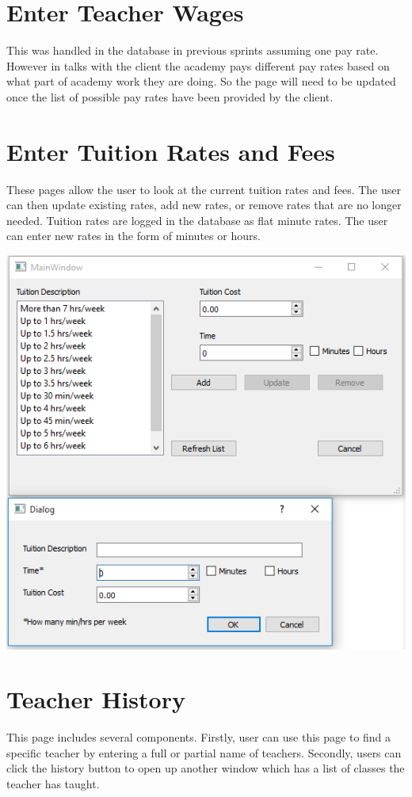 \documentclass[11pt]{book}
\begin{document}
\section{Enter Teacher Wages}
This was handled in the database in previous sprints assuming one pay rate. However in talks with the client the academy pays different pay rates based on what part of academy work they are doing. So the page will need to be updated once the list of possible pay rates have been provided by the client.

\section{Enter Tuition Rates and Fees}
These pages allow the user to look at the current tuition rates and fees. The user can then update existing rates, add new rates, or remove rates that are no longer needed. Tuition rates are logged in the database as flat minute rates. The user can enter new rates in the form of minutes or hours.

\includegraphics[scale=0.5]{tuitionRates.png}

\section{Teacher History}
This page includes several components. Firstly, user can use this page to find a specific teacher by entering a full or partial name of teachers. Secondly, users can click the history button to open up another window which has a list of classes the teacher has taught.\\
\end{document}

